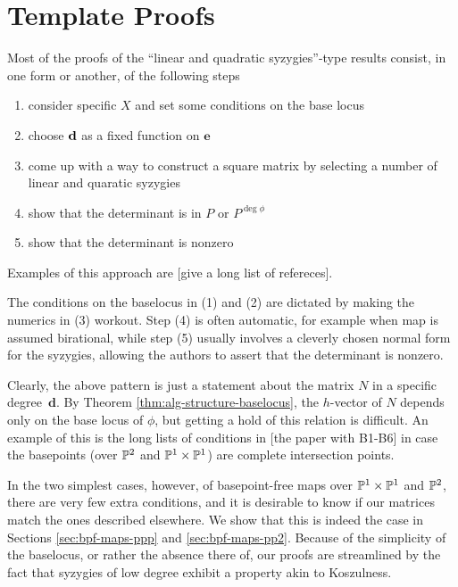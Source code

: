 \documentclass[fleqn,reqno]{amsart}
\numberwithin{first}{chapter}
\numberwithin{section}{chapter}
\numberwithin{equation}{first}
\begin{document}


\section{Template Proofs}

\begin{paragraf}
Most of the proofs of the ``linear and quadratic syzygies''-type results consist, in one form or another,
of the following steps
\begin{enumerate}
\item
consider specific $X$ and set some conditions on the base locus
\item
choose $\mathbf d$ as a fixed function on $\mathbf e$
\item
come up with a way to construct a square matrix by selecting a number of linear and quaratic syzygies
\item
show that the determinant is in $P$ or $P^{\deg\phi}$
\item
show that the determinant is nonzero
\end{enumerate}

Examples of this approach are [give a long list of refereces].

The conditions on the baselocus in (1) and (2) are dictated by making the numerics in (3) workout.
Step (4) is often automatic, for example when map is assumed birational,
while step (5) usually involves a cleverly chosen normal form for the syzygies,
allowing the authors to assert that the determinant is nonzero.
\end{paragraf}

\begin{paragraf*}
Clearly, the above pattern is just a statement about the matrix $N$ in a specific degree~$\mathbf d$.
By Theorem \ref{thm:alg-structure-baselocus},
the $h$-vector of $N$ depends only on the base locus of $\phi$,
but getting a hold of this relation is difficult.
An example of this is the long lists of conditions in [the paper with B1-B6]
in case the basepoints (over $\mathbb{P}^2$ and $\mathbb{P}^1\times\mathbb{P}^1$) are complete intersection points.

In the two simplest cases, however, of basepoint-free maps over $\mathbb{P}^1\times\mathbb{P}^1$ and $\mathbb{P}^2$,
there are very few extra conditions, and it is desirable to know if our matrices match the
ones described elsewhere.
We show that this is indeed the case in Sections \ref{sec:bpf-maps-ppp} and \ref{sec:bpf-maps-pp2}.
Because of the simplicity of the baselocus, or rather the absence there of,
our proofs are streamlined by the fact that syzygies of low degree exhibit a property akin to Koszulness.
\end{paragraf*}
\end{document}
